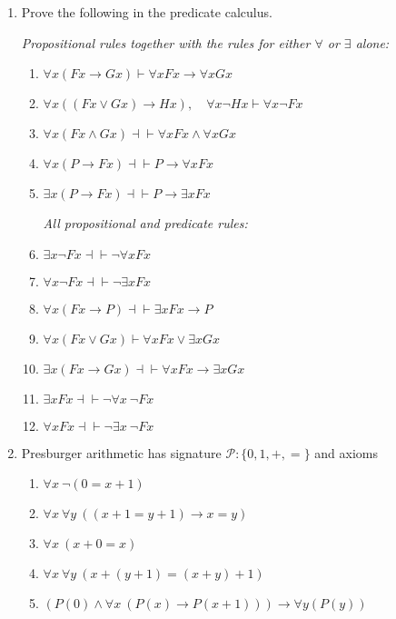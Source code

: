\documentclass[11pt]{report}
\begin{document}
\begin{enumerate}
	
	\item Prove the following in the predicate calculus. 
	
		\emph{Propositional rules together with the rules for either $\forall$ or $\exists$ alone:}

		\begin{enumerate}
			\item $\forall x (Fx \to Gx) \vdash  \forall x Fx \to \forall x Gx$
			\item $\forall x ((Fx \lor Gx) \to Hx),\quad \forall x \neg Hx \vdash  \forall x \neg Fx$
			\item $\forall x (Fx\land Gx) \dashv \vdash  \forall x Fx\land \forall x Gx$
			\item $\forall x (P \to Fx) \dashv \vdash  P \to \forall x Fx$
			\item $\exists x (P \to Fx) \dashv \vdash  P \to \exists x Fx$

			\emph{All propositional and predicate rules:}

			\item $\exists x \neg Fx \dashv \vdash  \neg  \forall x Fx$
			\item $\forall x \neg Fx \dashv \vdash  \neg \exists x Fx$
			\item $\forall x (Fx \to P) \dashv \vdash  \exists x Fx \to P$
			\item $\forall x (Fx \lor Gx) \vdash  \forall x Fx \lor \exists x Gx$
			\item $\exists x (Fx \to Gx) \dashv \vdash  \forall x Fx \to \exists x Gx$
			\item $\exists x Fx \dashv\vdash \lnot \forall x \ \lnot Fx$
			\item $\forall x Fx \dashv\vdash \lnot \exists x \ \lnot Fx$
		\end{enumerate}	

	\item Presburger arithmetic has signature $\mathcal{P}: \{0,1,+,=\}$ and axioms

		\begin{enumerate}
			\item $\forall x \ \lnot(0 = x + 1)$
			\item $\forall x \ \forall y \ ((x + 1  = y + 1) \rightarrow x = y)$
			\item $\forall x \ (x + 0 = x)$
			\item $\forall x \ \forall y \ (x + (y + 1) = (x + y) + 1)$
			\item $(P(0) \land \forall x \ (P(x) \to P(x+1))) \rightarrow \forall y (P(y))$
		\end{enumerate}
			

\end{enumerate}
\end{document}
